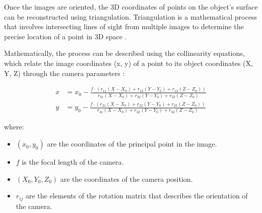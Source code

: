 \documentclass[12pt,a4paper,oneside]{report}
\begin{document}
Once the images are oriented, the 3D coordinates of points on the object's surface 
can be reconstructed using triangulation. Triangulation is a mathematical process 
that involves intersecting lines of sight from multiple images to determine the 
precise location of a point in 3D space
\cite{hartley_multiple_2003, furukawa_accurate_2009}.

Mathematically, the process can be described using the collinearity equations, which 
relate the image coordinates (x, y) of a point to its object coordinates (X, Y, Z) 
through the camera parameters
\cite{wolf_elements_2014, kraus_photogrammetry_2007}:

\[
\begin{aligned}
    x &= x_0 - \frac{f \cdot (r_{11}(X - X_0) + r_{12}(Y - Y_0) + r_{13}(Z - Z_0))}{r_{31}(X - X_0) + r_{32}(Y - Y_0) + r_{33}(Z - Z_0)} \\
    y &= y_0 - \frac{f \cdot (r_{21}(X - X_0) + r_{22}(Y - Y_0) + r_{23}(Z - Z_0))}{r_{31}(X - X_0) + r_{32}(Y - Y_0) + r_{33}(Z - Z_0)}
\end{aligned}
\]

where:
\begin{itemize}
    \item \( (x_0, y_0) \) are the coordinates of the principal point in the image.
    \item \( f \) is the focal length of the camera.
    \item \( (X_0, Y_0, Z_0) \) are the coordinates of the camera position.
    \item \( r_{ij} \) are the elements of the rotation matrix that describes the orientation of the camera.
\end{itemize}
\end{document}
